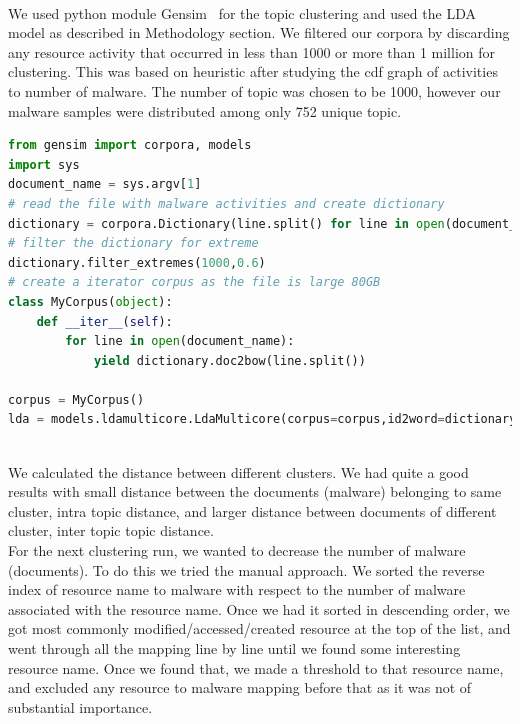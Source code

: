 \\
We used python module Gensim~\cite[Gensim]{gensim}  for the topic clustering and used the LDA model as described in Methodology section. We filtered our corpora by discarding any resource activity that occurred in less than 1000 or more than 1 million for clustering. This was based on heuristic after studying the cdf graph of activities to number of malware.
The number of topic was chosen to be 1000, however our malware samples were distributed among only 752 unique topic.
\begin{lstlisting}[float,floatplacement=H,language=python,caption={Script to run Gensim LDA},label={lbl:lda.py}]
from gensim import corpora, models
import sys
document_name = sys.argv[1]
# read the file with malware activities and create dictionary
dictionary = corpora.Dictionary(line.split() for line in open(document_name))
# filter the dictionary for extreme
dictionary.filter_extremes(1000,0.6)
# create a iterator corpus as the file is large 80GB
class MyCorpus(object):
    def __iter__(self):
        for line in open(document_name):
            yield dictionary.doc2bow(line.split())

corpus = MyCorpus()
lda = models.ldamulticore.LdaMulticore(corpus=corpus,id2word=dictionary,num_topics=1000)
\end{lstlisting}
\\
We calculated the distance between different clusters. We had quite a good results with small distance between the documents (malware) belonging to same cluster, intra topic distance, and larger distance between documents of different cluster, inter topic topic distance.
\\
For the next clustering run, we wanted to decrease the number of malware (documents).
To do this we tried the manual approach. We sorted the reverse index of resource name to malware with respect to the number of malware associated with the resource name.
Once we had it sorted in descending order, we got most commonly modified/accessed/created resource at the top of the list, and went through all the mapping line by line until we found some interesting resource name.
Once we found that, we made a threshold to that resource name, and excluded any resource to malware mapping before that as it was not of substantial importance.\\
